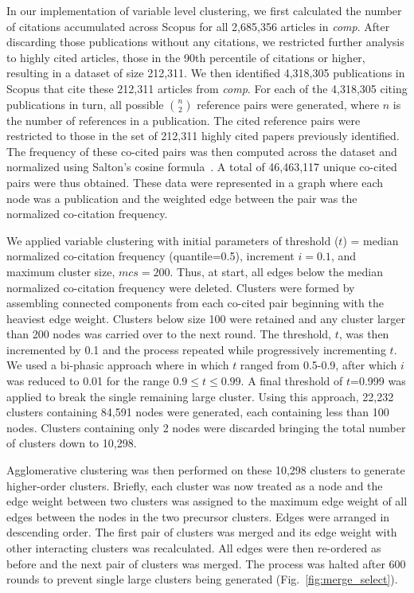 In our implementation of variable level clustering, we first calculated the number of citations accumulated across Scopus for all 2,685,356 articles in \emph{comp}. After discarding those publications without any citations, we restricted further analysis to highly cited articles, those in the 90th percentile of citations or higher, resulting in a dataset of size 212,311. We then identified 4,318,305 publications in Scopus that cite these 212,311 articles from \emph{comp}. For each of the 4,318,305 citing publications in turn, all possible ${n \choose 2}$ reference pairs were generated, where $n$ is the number of references in a publication. The cited reference pairs were restricted to those in the set of 212,311 highly cited papers previously identified. The frequency of these co-cited pairs was then computed across the dataset  and normalized using Salton's cosine formula~\cite{salton_citation_1979}. A total of 46,463,117 unique co-cited pairs were thus obtained. These data were represented in a graph where each node was a publication and the weighted edge between the pair was the normalized co-citation frequency. \par

We applied variable clustering with initial parameters of threshold ($t$) = median normalized co-citation frequency (quantile=0.5), increment $i = 0.1$, and maximum cluster size, $mcs=200$. Thus, at start, all edges below the median normalized co-citation frequency were deleted. Clusters were formed by assembling connected components from each co-cited pair beginning with the heaviest edge weight. Clusters below size 100 were retained and any cluster larger than 200 nodes was carried over to the next round. The threshold, $t$, was then incremented by 0.1 and the process repeated while progressively incrementing $t$.  We used a bi-phasic approach where in which $t$ ranged from 0.5-0.9, after which $i$ was reduced to 0.01 for the range $0.9 \leq t \leq 0.99$. A final threshold of $t$=0.999 was applied to break the single remaining large cluster.  Using this approach, 22,232 clusters containing 84,591 nodes were generated, each containing less than 100 nodes. Clusters containing only 2 nodes were discarded bringing the total number of clusters down to 10,298. 

Agglomerative clustering was then performed on these 10,298 clusters to generate higher-order clusters. Briefly, each cluster was now treated as a node and the edge weight between two clusters was assigned to the maximum edge weight of all edges between the nodes in the two precursor clusters. Edges were arranged in descending order. The first pair of clusters was merged and its edge weight with other interacting clusters was recalculated. All edges were then re-ordered as before and the next pair of clusters was merged. The process was halted after 600 rounds to prevent single large clusters being generated (Fig.~\ref{fig:merge_select}).

